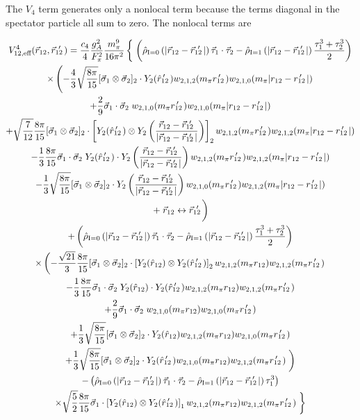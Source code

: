 \documentclass[%
 preprint,
 amsmath,amssymb,
 aps,
]{revtex4-1}
\newcommand{\rhohat}[2]{\hat{\rho}_{\text{I}=#1}\left( #2 \right)}
\newcommand{\rot}{\vec{r}_{12}}
\newcommand{\rotp}{\vec{r}_{12}\!\!\!'\,\,}
\newcommand{\rotpr}{r_{12}\!\!\!\!'\,\,\,}
\newcommand{\rotphat}{\hat{r}_{12}\!\!\!\!'\,\,\,}
\newcommand{\taudot}{\vec{\tau}_1\cdot\vec{\tau}_2}
\newcommand{\tauplusthree}{\frac{\tau_1^3+\tau_2^3}{2}}
\newcommand{\sigmadot}{\vec{\sigma}_1\cdot\vec{\sigma}_2}
\newcommand{\sigmatwo}{[\vec{\sigma}_1\otimes\vec{\sigma}_2]_2}
\newcommand{\fracphantom}{\vphantom{\frac{1}{1}}}
\newcommand{\w}[4]{w_{#1,#2,#3}(#4)}
\begin{document}
The $V_4$ term generates only a nonlocal term because the terms diagonal in the spectator particle all sum to zero. The nonlocal terms are

\begin{multline}
V^{4}_{12,\text{eff}}(\rot,\rotp) = \frac{c_4}{4}\frac{g_A^2}{F_\pi^2}\frac{m_\pi^9}{16\pi^2}\left\{ \fracphantom \right. 
\left(\rhohat{0}{|\rot-\rotp|}\taudot-\rhohat{1}{|\rot-\rotp|}\tauplusthree\right)
\\
\times\left( -\frac{4}{3}\sqrt{\frac{8\pi}{15}}\sigmatwo\cdot Y_2(\rotphat)\w{2}{1}{2}{m_\pi \rotpr}\w{2}{1}{0}{m_\pi |r_{12}- \rotpr|} \right. \\
+\frac{2}{9}\sigmadot\; \w{2}{1}{0}{m_\pi \rotpr}\w{2}{1}{0}{m_\pi |r_{12}- \rotpr|} \\
+\sqrt{\frac{7}{12}}\frac{8\pi}{15}\sigmatwo\cdot \left[ Y_2(\rotphat)\otimes Y_2 \left(\frac{\rot-\rotp}{|\rot-\rotp|}\right) \right]_2 \w{2}{1}{2}{m_\pi \rotpr}\w{2}{1}{2}{m_\pi |r_{12}- \rotpr|} \\
-\frac{1}{3}\frac{8\pi}{15}\sigmadot \; Y_2(\rotphat)\cdot Y_2\left(\frac{\rot-\rotp}{|\rot-\rotp|}\right) \w{2}{1}{2}{m_\pi \rotpr}\w{2}{1}{2}{m_\pi |r_{12}- \rotpr|} \\
-\frac{1}{3}\sqrt{\frac{8\pi}{15}}\sigmatwo\cdot Y_2\left(\frac{\rot-\rotp}{|\rot-\rotp|}\right)\w{2}{1}{0}{m_\pi \rotpr}\w{2}{1}{2}{m_\pi |r_{12}- \rotpr|} \\
\left.+\; \rot \leftrightarrow \rotp \fracphantom\right) \\
+\left(\rhohat{0}{|\rot-\rotp|}\taudot-\rhohat{1}{|\rot-\rotp|}\tauplusthree\right) \\
\times \left( 
-\frac{\sqrt{21}}{3}\frac{8\pi}{15}\sigmatwo \cdot \left[Y_2(\hat{r}_{12})\otimes Y_2(\rotphat)\right]_2 \w{2}{1}{2}{m_\pi r_{12}} \w{2}{1}{2}{m_\pi \rotpr} \right. \\
-\frac{1}{3}\frac{8\pi}{15}\sigmadot\; Y_2(\hat{r}_{12}) \cdot Y_2(\rotphat)\w{2}{1}{2}{m_\pi r_{12}} \w{2}{1}{2}{m_\pi \rotpr} \\
+\frac{2}{9}\sigmadot \;\w{2}{1}{0}{m_\pi r_{12}} \w{2}{1}{0}{m_\pi \rotpr} \\
+\frac{1}{3}\sqrt{\frac{8\pi}{15}} \sigmatwo \cdot Y_2(\hat{r}_{12}) \w{2}{1}{2}{m_\pi r_{12}} \w{2}{1}{0}{m_\pi \rotpr} \\
+\frac{1}{3}\sqrt{\frac{8\pi}{15}} \sigmatwo \cdot Y_2(\rotphat) \w{2}{1}{0}{m_\pi r_{12}} \w{2}{1}{2}{m_\pi \rotpr} \left.\fracphantom\right) \\
%
-\left(\rhohat{0}{|\rot-\rotp|}\taudot-\rhohat{1}{|\rot-\rotp|}\tau_1^3 \right) \\
\times\sqrt{\frac{5}{2}} \frac{8\pi}{15} \vec{\sigma}_1\cdot\left[Y_2(\hat{r}_{12})\otimes Y_2(\rotphat)\right]_1 \w{2}{1}{2}{m_\pi r_{12}} \w{2}{1}{2}{m_\pi \rotpr} \left.\fracphantom\right\}
\end{multline}
\end{document}
